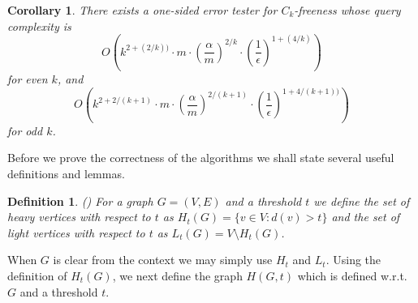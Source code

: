 \documentclass{article}
\newcommand{\eps}{\epsilon}
\newtheorem{corollary}[theorem]{Corollary}
\newtheorem{definition}{Definition}
\newcommand{\commentt}[1]{ {}}
\begin{document}


\begin{corollary}\label{cor:Ck-ub}
There exists a one-sided error tester for $C_k$-freeness whose query complexity is
$$O\left(k^{2+(2/k))} \cdot m \cdot \left(\frac{\alpha}{m }\right)^{2/k} \cdot \left(\frac{1}{\epsilon}\right)^{1+(4/k)}\right)$$
for even $k$, and
$$O\left(k^{2+2/(k+1)} \cdot m \cdot \left(\frac{\alpha}{m }\right)^{2/(k+1)} \cdot \left(\frac{1}{\epsilon}\right)^{1+4/(k+1))}\right)$$
for odd $k$.
\end{corollary}

\iffalse
Before we prove the correctness of the algorithms we shall state several useful definitions and lemmas.

\commentt{Some of the following is common to all our algorithms. Ideally, I would suggest to  move a general version to the preliminaries and then use it everywhere, or maybe it will be simpler to just say here, the similarly to previous sections, there exists a set $\mathcal{F}$ of at least $\eps m/(2k)$ edge-disjoint copies of $F$ in $G$ (where $k = |V(F)|$ such that no copy includes an edge between two heavy vertices?}

\begin{definition}(\cite{})
For a graph $G = (V, E)$ and a threshold $t$ we define the set of {\em heavy vertices with respect to $t$} as $H_t(G) = \{v\in V: d(v) > t\}$
and the set of {\em light vertices with respect to $t$} as $L_t(G) = V \setminus H_t(G)$.
\end{definition}
When $G$ is clear from the context we may simply use $H_t$ and $L_t$.
Using the definition of $H_t(G)$, we next define the graph $H(G, t)$ which is defined w.r.t. $G$ and a threshold $t$.
\end{document}
